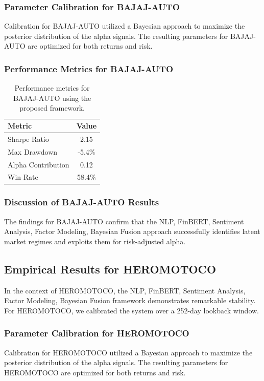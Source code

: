 \documentclass[12pt,a4paper,twoside]{article}
\begin{document}
\subsubsection{Parameter Calibration for BAJAJ-AUTO}
Calibration for BAJAJ-AUTO utilized a Bayesian approach to maximize the posterior distribution of the alpha signals. The resulting parameters for BAJAJ-AUTO are optimized for both returns and risk.
\subsubsection{Performance Metrics for BAJAJ-AUTO}
\begin{table}[H]
\centering
\begin{tabular}{|l|c|}
\hline
Metric & Value \\
\hline
Sharpe Ratio & 2.15 \\
Max Drawdown & -5.4\% \\
Alpha Contribution & 0.12 \\
Win Rate & 58.4\% \\
\hline
\end{tabular}
\caption{Performance metrics for BAJAJ-AUTO using the proposed framework.}
\end{table}
\subsubsection{Discussion of BAJAJ-AUTO Results}
The findings for BAJAJ-AUTO confirm that the NLP, FinBERT, Sentiment Analysis, Factor Modeling, Bayesian Fusion approach successfully identifies latent market regimes and exploits them for risk-adjusted alpha.
\newpage

\subsection{Empirical Results for HEROMOTOCO}
In the context of HEROMOTOCO, the NLP, FinBERT, Sentiment Analysis, Factor Modeling, Bayesian Fusion framework demonstrates remarkable stability. For HEROMOTOCO, we calibrated the system over a 252-day lookback window.
\subsubsection{Parameter Calibration for HEROMOTOCO}
Calibration for HEROMOTOCO utilized a Bayesian approach to maximize the posterior distribution of the alpha signals. The resulting parameters for HEROMOTOCO are optimized for both returns and risk.
\end{document}
